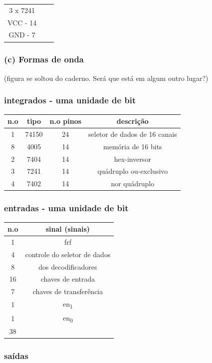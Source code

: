 \documentclass{article}
\begin{document}
\begin{tabular}{c c c}
3 x 7241 \\
VCC - 14 \\
GND - 7 \\
\end{tabular}

\subsubsection{(c) Formas de onda}
(figura se soltou do caderno. Será que está em algum outro lugar?)

\subsubsection{integrados - uma unidade de bit}

\begin{tabular}{|c|c|c|c|}
\hline
n.o & tipo & n.o pinos & descrição \\
\hline
1 & 74150 & 24 & seletor de dados de 16 canais \\
8 & 4005 & 14 & memória de 16 bits \\
2 & 7404 & 14 & hex-inversor \\
3 & 7241 & 14 & quádruplo ou-exclusivo \\
4 & 7402 & 14 & nor quádruplo \\
\hline
\end{tabular}

\subsubsection{entradas - uma unidade de bit}

\begin{tabular}{|c|c|}
\hline
n.o & sinal (sinais) \\
\hline
1 & frf \\
4 & controle do seletor de dados \\
8 & dos decodificadores \\
16 & chaves de entrada \\
7 & chaves de transferência \\
1 & en\textsubscript{1} \\
1 & en\textsubscript{0} \\
\hline
38 & \\
\hline
\end{tabular}

\subsubsection{saídas}
\end{document}
